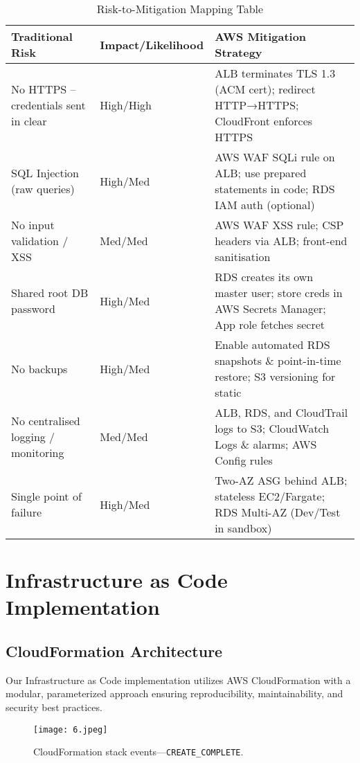 \documentclass[12pt]{article}
\begin{document}
\begin{table}[H]
\centering
\begin{tabular}{|p{4.5cm}|p{2.5cm}|p{6cm}|}
\hline
\textbf{Traditional Risk} & \textbf{Impact/Likelihood} & \textbf{AWS Mitigation Strategy} \\
\hline
No HTTPS – credentials sent in clear & High/High & ALB terminates TLS 1.3 (ACM cert); redirect HTTP→HTTPS; CloudFront enforces HTTPS \\
\hline
SQL Injection (raw queries) & High/Med & AWS WAF SQLi rule on ALB; use prepared statements in code; RDS IAM auth (optional) \\
\hline
No input validation / XSS & Med/Med & AWS WAF XSS rule; CSP headers via ALB; front-end sanitisation \\
\hline
Shared root DB password & High/Med & RDS creates its own master user; store creds in AWS Secrets Manager; App role fetches secret \\
\hline
No backups & High/Med & Enable automated RDS snapshots \& point-in-time restore; S3 versioning for static \\
\hline
No centralised logging / monitoring & Med/Med & ALB, RDS, and CloudTrail logs to S3; CloudWatch Logs \& alarms; AWS Config rules \\
\hline
Single point of failure & High/Med & Two-AZ ASG behind ALB; stateless EC2/Fargate; RDS Multi-AZ (Dev/Test in sandbox) \\
\hline
\end{tabular}
\caption{Risk-to-Mitigation Mapping Table}
\label{tab:risk_mitigation}
\end{table}

\section{Infrastructure as Code Implementation}

\subsection{CloudFormation Architecture}

Our Infrastructure as Code implementation utilizes AWS CloudFormation with a modular, parameterized approach ensuring reproducibility, maintainability, and security best practices.

\begin{figure}[H]
\centering
\texttt{[image: 6.jpeg]}
\caption{CloudFormation stack events—\texttt{CREATE\_COMPLETE}.}
\label{fig:cloudformation_success}
\end{figure}
\end{document}
